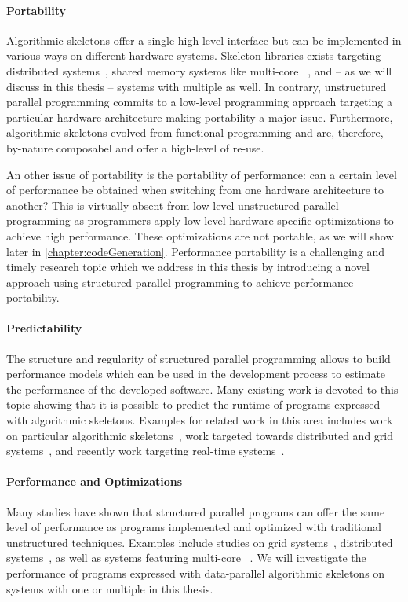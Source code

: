 \paragraph{Portability}
Algorithmic skeletons offer a single high-level interface but can be implemented in various ways on different hardware systems.
Skeleton libraries exists targeting distributed systems~\cite{}, shared memory systems like multi-core \CPUs~\cite{}, and -- as we will discuss in this thesis -- systems with multiple \GPUs as well.
In contrary, unstructured parallel programming commits to a low-level programming approach targeting a particular hardware architecture making portability a major issue.
Furthermore, algorithmic skeletons evolved from functional programming and are, therefore, by-nature composabel and offer a high-level of re-use.

An other issue of portability is the portability of performance:
can a certain level of performance be obtained when switching from one hardware architecture to another?
This is virtually absent from low-level unstructured parallel programming as programmers apply low-level hardware-specific optimizations to achieve high performance.
These optimizations are not portable, as we will show later in \autoref{chapter:codeGeneration}.
Performance portability is a challenging and timely research topic which we address in this thesis by introducing a novel approach using structured parallel programming to achieve performance portability.

\paragraph{Predictability}
The structure and regularity of structured parallel programming allows to build performance models which can be used in the development process to estimate the performance of the developed software.
Many existing work is devoted to this topic showing that it is possible to predict the runtime of programs expressed with algorithmic skeletons.
Examples for related work in this area includes work on particular algorithmic skeletons~\cite{BischofGK03}, work targeted towards distributed and grid systems~\cite{Alt2007,JavedL11}, and recently work targeting real-time systems~\cite{StegmeierFrJAUn2015}.

\paragraph{Performance and Optimizations}
Many studies have shown that structured parallel programs can offer the same level of performance as programs implemented and optimized with traditional unstructured techniques.
Examples include studies on grid systems~\cite{Alt2007}, distributed systems~\cite{}, as well as systems featuring multi-core \CPUs~\cite{}.
We will investigate the performance of programs expressed with data-parallel algorithmic skeletons on systems with one or multiple \GPUs in this thesis.

